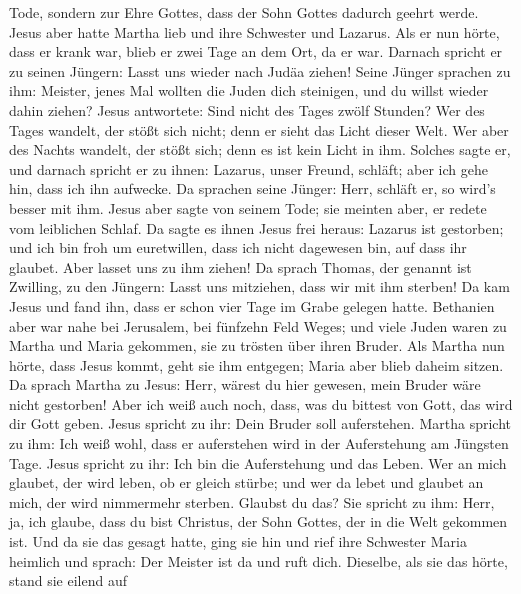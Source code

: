 Tode, sondern zur Ehre Gottes, dass der Sohn Gottes dadurch geehrt
werde.  Jesus aber hatte Martha lieb und ihre Schwester und
Lazarus.  Als er nun hörte, dass er krank war, blieb er zwei
Tage an dem Ort, da er war.  Darnach spricht er zu seinen
Jüngern: Lasst uns wieder nach Judäa ziehen!  Seine Jünger
sprachen zu ihm: Meister, jenes Mal wollten die Juden dich steinigen,
und du willst wieder dahin ziehen?  Jesus antwortete: Sind
nicht des Tages zwölf Stunden? Wer des Tages wandelt, der stößt sich
nicht; denn er sieht das Licht dieser Welt.  Wer aber des
Nachts wandelt, der stößt sich; denn es ist kein Licht in ihm.
 Solches sagte er, und darnach spricht er zu ihnen:
Lazarus, unser Freund, schläft; aber ich gehe hin, dass ich ihn
aufwecke.  Da sprachen seine Jünger: Herr, schläft er, so
wird's besser mit ihm.  Jesus aber sagte von seinem Tode;
sie meinten aber, er redete vom leiblichen Schlaf.  Da
sagte es ihnen Jesus frei heraus: Lazarus ist gestorben; 
und ich bin froh um euretwillen, dass ich nicht dagewesen bin, auf dass
ihr glaubet. Aber lasset uns zu ihm ziehen!  Da sprach
Thomas, der genannt ist Zwilling, zu den Jüngern: Lasst uns mitziehen,
dass wir mit ihm sterben!  Da kam Jesus und fand ihn, dass
er schon vier Tage im Grabe gelegen hatte.  Bethanien aber
war nahe bei Jerusalem, bei fünfzehn Feld Weges;  und viele
Juden waren zu Martha und Maria gekommen, sie zu trösten über ihren
Bruder.  Als Martha nun hörte, dass Jesus kommt, geht sie
ihm entgegen; Maria aber blieb daheim sitzen.  Da sprach
Martha zu Jesus: Herr, wärest du hier gewesen, mein Bruder wäre nicht
gestorben!  Aber ich weiß auch noch, dass, was du bittest
von Gott, das wird dir Gott geben.  Jesus spricht zu ihr:
Dein Bruder soll auferstehen.  Martha spricht zu ihm: Ich
weiß wohl, dass er auferstehen wird in der Auferstehung am Jüngsten
Tage.  Jesus spricht zu ihr: Ich bin die Auferstehung und
das Leben. Wer an mich glaubet, der wird leben, ob er gleich stürbe;
 und wer da lebet und glaubet an mich, der wird nimmermehr
sterben. Glaubst du das?  Sie spricht zu ihm: Herr, ja, ich
glaube, dass du bist Christus, der Sohn Gottes, der in die Welt gekommen
ist.  Und da sie das gesagt hatte, ging sie hin und rief
ihre Schwester Maria heimlich und sprach: Der Meister ist da und ruft
dich.  Dieselbe, als sie das hörte, stand sie eilend auf
